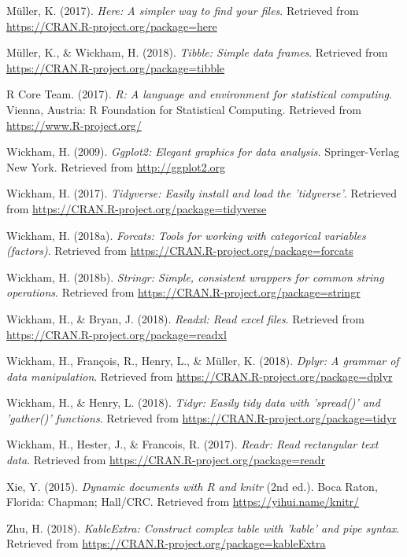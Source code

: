 \documentclass[,man]{apa6}
\begin{document}
\leavevmode\hypertarget{ref-R-here}{}%
Müller, K. (2017). \emph{Here: A simpler way to find your files}.
Retrieved from \url{https://CRAN.R-project.org/package=here}

\leavevmode\hypertarget{ref-R-tibble}{}%
Müller, K., \& Wickham, H. (2018). \emph{Tibble: Simple data frames}.
Retrieved from \url{https://CRAN.R-project.org/package=tibble}

\leavevmode\hypertarget{ref-R-base}{}%
R Core Team. (2017). \emph{R: A language and environment for statistical
computing}. Vienna, Austria: R Foundation for Statistical Computing.
Retrieved from \url{https://www.R-project.org/}

\leavevmode\hypertarget{ref-R-ggplot2}{}%
Wickham, H. (2009). \emph{Ggplot2: Elegant graphics for data analysis}.
Springer-Verlag New York. Retrieved from \url{http://ggplot2.org}

\leavevmode\hypertarget{ref-R-tidyverse}{}%
Wickham, H. (2017). \emph{Tidyverse: Easily install and load the
'tidyverse'}. Retrieved from
\url{https://CRAN.R-project.org/package=tidyverse}

\leavevmode\hypertarget{ref-R-forcats}{}%
Wickham, H. (2018a). \emph{Forcats: Tools for working with categorical
variables (factors)}. Retrieved from
\url{https://CRAN.R-project.org/package=forcats}

\leavevmode\hypertarget{ref-R-stringr}{}%
Wickham, H. (2018b). \emph{Stringr: Simple, consistent wrappers for
common string operations}. Retrieved from
\url{https://CRAN.R-project.org/package=stringr}

\leavevmode\hypertarget{ref-R-readxl}{}%
Wickham, H., \& Bryan, J. (2018). \emph{Readxl: Read excel files}.
Retrieved from \url{https://CRAN.R-project.org/package=readxl}

\leavevmode\hypertarget{ref-R-dplyr}{}%
Wickham, H., François, R., Henry, L., \& Müller, K. (2018). \emph{Dplyr:
A grammar of data manipulation}. Retrieved from
\url{https://CRAN.R-project.org/package=dplyr}

\leavevmode\hypertarget{ref-R-tidyr}{}%
Wickham, H., \& Henry, L. (2018). \emph{Tidyr: Easily tidy data with
'spread()' and 'gather()' functions}. Retrieved from
\url{https://CRAN.R-project.org/package=tidyr}

\leavevmode\hypertarget{ref-R-readr}{}%
Wickham, H., Hester, J., \& Francois, R. (2017). \emph{Readr: Read
rectangular text data}. Retrieved from
\url{https://CRAN.R-project.org/package=readr}

\leavevmode\hypertarget{ref-R-knitr}{}%
Xie, Y. (2015). \emph{Dynamic documents with R and knitr} (2nd ed.).
Boca Raton, Florida: Chapman; Hall/CRC. Retrieved from
\url{https://yihui.name/knitr/}

\leavevmode\hypertarget{ref-R-kableExtra}{}%
Zhu, H. (2018). \emph{KableExtra: Construct complex table with 'kable'
and pipe syntax}. Retrieved from
\url{https://CRAN.R-project.org/package=kableExtra}

\endgroup
\end{document}
